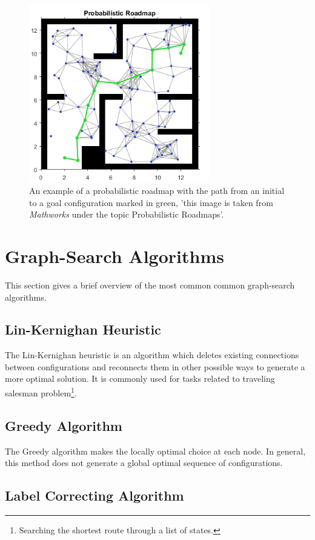 \begin{figure} [h]
	\centering
	\includegraphics[width=0.7\textwidth]{images/prm.png}
	\caption{An example of a probabilistic roadmap with the path from an initial to a goal configuration marked in green, 'this image is taken from \textit{Mathworks} under the topic Probabilistic Roadmaps'.}
	\label{pics:prm}
\end{figure} 

\section{Graph-Search Algorithms}
\label{sec:graph_search}
This section gives a brief overview of the most common common graph-search algorithms.
\subsection{Lin-Kernighan Heuristic}
The Lin-Kernighan heuristic is an algorithm which deletes existing connections between configurations and reconnects them in other possible ways to generate a more optimal solution. It is commonly used for tasks related to traveling salesman problem\footnote{Searching the shortest route through a list of states.}.

\subsection{Greedy Algorithm}
The Greedy algorithm makes the locally optimal choice at each node. In general, this method does not generate a global optimal sequence of configurations.

\subsection{Label Correcting Algorithm}

